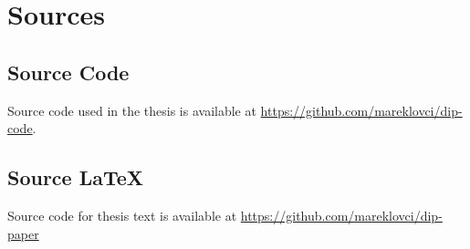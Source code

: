 \chapter{Sources}\label{ch:sources}

\section{Source Code}\label{sec:source-code}

Source code used in the thesis is available at \url{https://github.com/mareklovci/dip-code}.

\section{Source \LaTeX}\label{sec:source-latex}

Source code for thesis text is available at \url{https://github.com/mareklovci/dip-paper}
